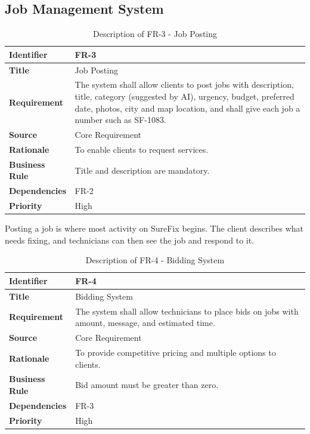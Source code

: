 \documentclass[A4paper,12pt]{report}
\theoremstyle{plain}
\theoremstyle{definition}
\theoremstyle{remark}
\numberwithin{equation}{section}
\begin{document}
\subsection{Job Management System}

\begin{table}[h!]
\centering
\caption{Description of FR-3 - Job Posting}
\begin{tabular}{|p{}|p{}|}
\hline
\textbf{Identifier} & FR-3 \\ \hline
\textbf{Title} & Job Posting \\ \hline
\textbf{Requirement} & The system shall allow clients to post jobs with description, title, category (suggested by AI), urgency, budget, preferred date, photos, city and map location, and shall give each job a number such as SF-1083. \\ \hline
\textbf{Source} & Core Requirement \\ \hline
\textbf{Rationale} & To enable clients to request services. \\ \hline
\textbf{Business Rule} & Title and description are mandatory. \\ \hline
\textbf{Dependencies} & FR-2 \\ \hline
\textbf{Priority} & High \\ \hline
\end{tabular}
\end{table}

Posting a job is where most activity on SureFix begins. The client describes what needs fixing, and technicians can then see the job and respond to it.


\begin{table}[h!]
\centering
\caption{Description of FR-4 - Bidding System}
\begin{tabular}{|p{}|p{}|}
\hline
\textbf{Identifier} & FR-4 \\ \hline
\textbf{Title} & Bidding System \\ \hline
\textbf{Requirement} & The system shall allow technicians to place bids on jobs with amount, message, and estimated time. \\ \hline
\textbf{Source} & Core Requirement \\ \hline
\textbf{Rationale} & To provide competitive pricing and multiple options to clients. \\ \hline
\textbf{Business Rule} & Bid amount must be greater than zero. \\ \hline
\textbf{Dependencies} & FR-3 \\ \hline
\textbf{Priority} & High \\ \hline
\end{tabular}
\end{table}
\end{document}
